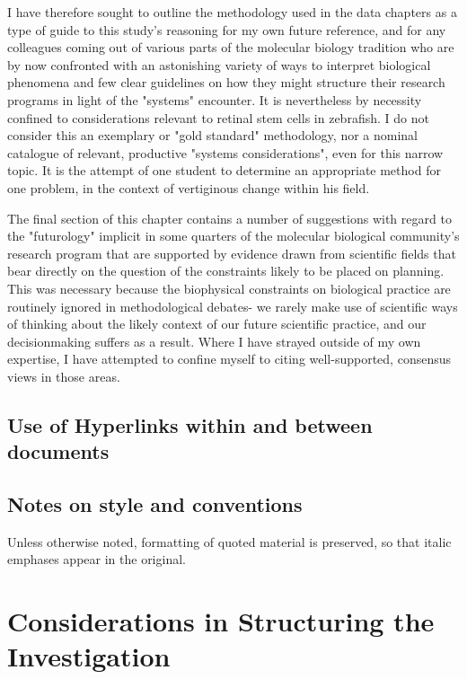 I have therefore sought to outline the methodology used in the data chapters as a type of guide to this study's reasoning for my own future reference, and for any colleagues coming out of various parts of the molecular biology tradition who are by now confronted with an astonishing variety of ways to interpret biological phenomena and few clear guidelines on how they might structure their research programs in light of the "systems" encounter. It is nevertheless by necessity confined to considerations relevant to retinal stem cells in zebrafish. I do not consider this an exemplary or "gold standard" methodology, nor a nominal catalogue of relevant, productive "systems considerations", even for this narrow topic. It is the attempt of one student to determine an appropriate method for one problem, in the context of vertiginous change within his field.

The final section of this chapter contains a number of suggestions with regard to the "futurology" implicit in some quarters of the molecular biological community's research program that are supported by evidence drawn from scientific fields that bear directly on the question of the constraints likely to be placed on planning. This was necessary because the biophysical constraints on biological practice are routinely ignored in methodological debates- we rarely make use of scientific ways of thinking about the likely context of our future scientific practice, and our decisionmaking suffers as a result. Where I have strayed outside of my own expertise, I have attempted to confine myself to citing well-supported, consensus views in those areas.


\subsection{Use of Hyperlinks within and between documents}

\subsection{Notes on style and conventions}

Unless otherwise noted, formatting of quoted material is preserved, so that italic emphases appear in the original.

\section{Considerations in Structuring the Investigation}

